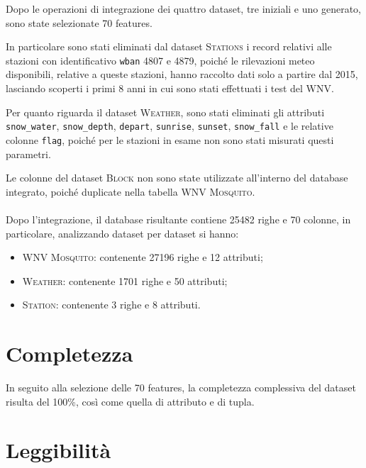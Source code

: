 Dopo le operazioni di integrazione dei quattro dataset, tre iniziali e uno 
generato, sono state selezionate 70 features.

In particolare sono stati eliminati dal dataset \textsc{Stations} i record 
relativi alle stazioni con identificativo \texttt{wban} {4807} e {4879}, poiché 
le rilevazioni meteo disponibili, relative a queste stazioni, hanno raccolto 
dati solo a partire dal 2015, lasciando scoperti i primi 8 anni in cui sono 
stati effettuati i test del WNV.

Per quanto riguarda il dataset \textsc{Weather}, sono stati eliminati gli 
attributi \texttt{snow\_water}, \texttt{snow\_depth}, \texttt{depart}, 
\texttt{sunrise}, \texttt{sunset}, \texttt{snow\_fall} e le relative colonne 
\texttt{flag}, poiché per le stazioni in esame non sono stati misurati questi 
parametri.

Le colonne del dataset \textsc{Block} non sono state utilizzate all'interno del 
database integrato, poiché duplicate nella tabella \textsc{WNV Mosquito}.\\
\\
Dopo l'integrazione, il database risultante contiene 25482 righe e 70 colonne, 
in particolare, analizzando dataset per dataset si hanno:
\begin{itemize}
	\item \textsc{WNV Mosquito}: contenente 27196 righe e 12 attributi;
	\item \textsc{Weather}: contenente 1701 righe e 50 attributi;
	\item \textsc{Station}: contenente 3 righe e 8 attributi.
\end{itemize}


\section{Completezza}
In seguito alla selezione delle 70 features, la completezza complessiva del 
dataset risulta del 100\%, così come quella di attributo e di tupla.

\section{Leggibilità}
